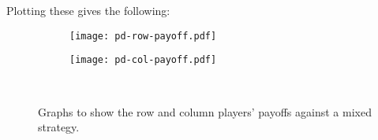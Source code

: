 Plotting these gives the following:

\begin{figure}[h]
    \centering
        \begin{subfigure}[t]{0.45\textwidth}
        \centering
            \texttt{[image: pd-row-payoff.pdf]}
        \end{subfigure}
    \hfill
        \begin{subfigure}[t]{0.45\textwidth}
        \centering
            \texttt{[image: pd-col-payoff.pdf]}
        \end{subfigure}
    ~
    \caption{Graphs to show the row and column players' payoffs against a mixed strategy.}
    \label{MixedStrstegiesPD}
    \end{figure}